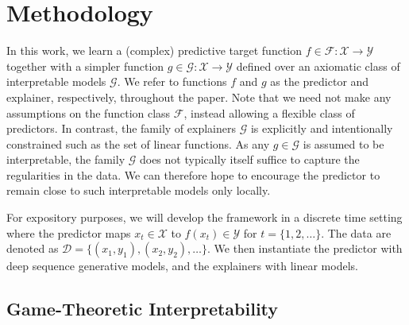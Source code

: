 \section{Methodology}
\label{sec:method}

In this work, we learn a (complex) predictive target function $f\in \mathcal{F}: \mathcal{X} \to \mathcal{Y}$ together with a simpler function $g \in \mathcal{G}:\mathcal{X}\to\mathcal{Y}$ defined over an axiomatic class of interpretable models $\mathcal{G}$. We refer to functions $f$ and $g$ as the predictor and explainer, respectively, throughout the paper. Note that we need not make any assumptions on the function class $\mathcal{F}$, instead allowing a flexible class of predictors. In contrast,
the family of explainers $\mathcal{G}$ is explicitly and intentionally constrained such as the set of linear functions. As any $g\in \mathcal{G}$ is assumed to be interpretable, the family $\mathcal{G}$ does not typically itself suffice to capture the regularities in the data. We can therefore hope to encourage the predictor to remain close to such interpretable models only locally. 


For expository purposes, we will develop the framework in a discrete time setting where the predictor maps  $x_t \in \mathcal{X}$ to $f(x_t) \in \mathcal{Y}$ for $t=\{1, 2, \dots\}$. 
The data are denoted as $\mathcal{D}=\{(x_1,y_1), (x_2,y_2), \dots\}$. 
We then instantiate the predictor with deep sequence generative models, and the explainers with linear models.

\subsection{Game-Theoretic Interpretability}

